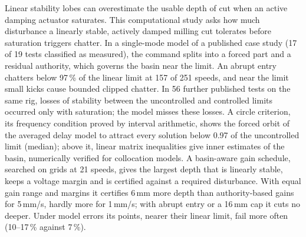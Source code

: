 Linear stability lobes can overestimate the usable depth of cut when an active damping actuator saturates. This computational study asks how much disturbance a linearly stable, actively damped milling cut tolerates before saturation triggers chatter. In a single-mode model of a published case study (17 of 19 tests classified as measured), the command splits into a forced part and a residual authority, which governs the basin near the limit. An abrupt entry chatters below 97\,\% of the linear limit at 157 of 251 speeds, and near the limit small kicks cause bounded clipped chatter. In 56 further published tests on the same rig, losses of stability between the uncontrolled and controlled limits occurred only with saturation; the model misses these losses. A circle criterion, its frequency condition proved by interval arithmetic, shows the forced orbit of the averaged delay model to attract every solution below 0.97 of the uncontrolled limit (median); above it, linear matrix inequalities give inner estimates of the basin, numerically verified for collocation models. A basin-aware gain schedule, searched on grids at 21 speeds, gives the largest depth that is linearly stable, keeps a voltage margin and is certified against a required disturbance. With equal gain range and margins it certifies 6\,mm more depth than authority-based gains for 5\,mm/s, hardly more for 1\,mm/s; with abrupt entry or a 16\,mm cap it cuts no deeper. Under model errors its points, nearer their linear limit, fail more often (10--17\,\% against 7\,\%).
